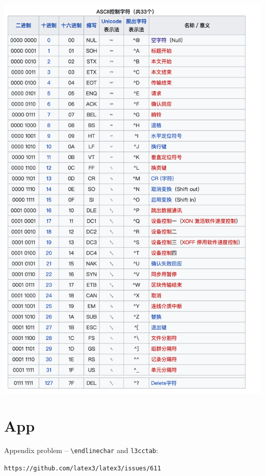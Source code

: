 \documentclass{article}
\begin{document}
\begin{center}
  \includegraphics[height=.3\paperheight]{./ascii-2.png}
\end{center}

\section{App}
Appendix problem -- \verb|\endlinechar| and \verb|l3cctab|:\par 
\texttt{https://github.com/latex3/latex3/issues/611}
\end{document}
